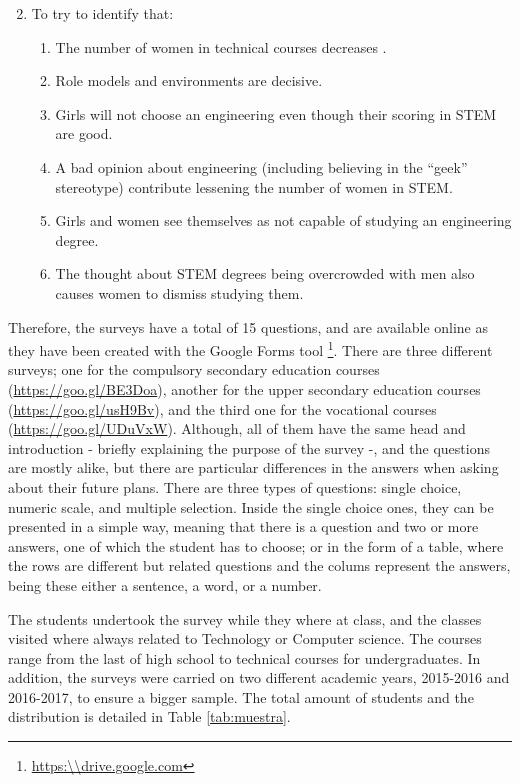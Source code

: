 \documentclass[journal,transmag]{IEEEtran}
\begin{document}
\begin{enumerate}
  \setcounter{enumi}{1}
  \item To try to identify that:
  \begin{enumerate}
  \item The number of women in technical courses decreases .
  \item Role models and environments are decisive.
  \item Girls will not choose an engineering even though their scoring in STEM are good.
  \item A bad opinion about engineering (including believing in the ``geek'' stereotype) contribute lessening the number of women in STEM.
  \item Girls and women see themselves as not capable of studying an engineering degree.
  \item The thought about STEM degrees being overcrowded with men also causes women to dismiss studying them.
  \end{enumerate}
\end{enumerate}

Therefore, the surveys have a total of 15 questions, and are available online as they have been created with the Google Forms tool \footnote{\url{https:\\drive.google.com}}. There are three different surveys; one for the compulsory secondary education courses (\url{https://goo.gl/BE3Doa}), another for the upper secondary education courses (\url{https://goo.gl/usH9Bv}), and the third one for the vocational courses (\url{https://goo.gl/UDuVxW}). Although, all of them have the same head and introduction - briefly explaining the purpose of the survey -\cite{cohen2013research}, and the questions are mostly alike, but there are particular differences in the answers when asking about their future plans. There are three types of questions: single choice, numeric scale, and multiple selection. Inside the single choice ones, they can be presented in a simple way, meaning that there is a question and two or more answers, one of which the student has to choose; or in the form of a table, where the rows are different but related questions and the colums represent the answers, being these either a sentence, a word, or a number.

The students undertook the survey while they where at class, and the classes visited where always related to Technology or Computer science. The courses range from the last of high school to technical courses for undergraduates. In addition, the surveys were carried on two different academic years, 2015-2016 and 2016-2017, to ensure a bigger sample. The total amount of students and the distribution is detailed in Table \ref{tab:muestra}.
\end{document}
